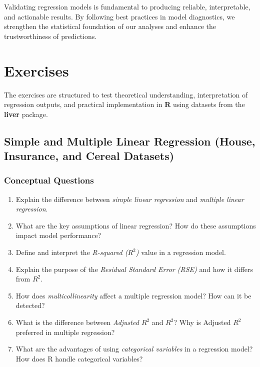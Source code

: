 \documentclass[
]{book}
\providecommand{\tightlist}{%
  \setlength{\itemsep}{0pt}\setlength{\parskip}{0pt}}
\theoremstyle{definition}
\theoremstyle{definition}
\theoremstyle{definition}
\theoremstyle{definition}
\theoremstyle{remark}
\begin{document}
Validating regression models is fundamental to producing reliable, interpretable, and actionable results. By following best practices in model diagnostics, we strengthen the statistical foundation of our analyses and enhance the trustworthiness of predictions.

\section{Exercises}\label{regression-exercises}

The exercises are structured to test theoretical understanding, interpretation of regression outputs, and practical implementation in \textbf{R} using datasets from the \textbf{liver} package.

\subsection*{Simple and Multiple Linear Regression (House, Insurance, and Cereal Datasets)}\label{simple-and-multiple-linear-regression-house-insurance-and-cereal-datasets}

\subsubsection*{Conceptual Questions}\label{conceptual-questions-6}

\begin{enumerate}
\def\labelenumi{\arabic{enumi}.}
\tightlist
\item
  Explain the difference between \emph{simple linear regression} and \emph{multiple linear regression}.\\
\item
  What are the key assumptions of linear regression? How do these assumptions impact model performance?\\
\item
  Define and interpret the \emph{R-squared (\(R^2\))} value in a regression model.\\
\item
  Explain the purpose of the \emph{Residual Standard Error (RSE)} and how it differs from \(R^2\).\\
\item
  How does \emph{multicollinearity} affect a multiple regression model? How can it be detected?\\
\item
  What is the difference between \emph{Adjusted \(R^2\)} and \emph{\(R^2\)}? Why is Adjusted \(R^2\) preferred in multiple regression?
\item
  What are the advantages of using \emph{categorical variables} in a regression model? How does R handle categorical variables?
\end{enumerate}
\end{document}
